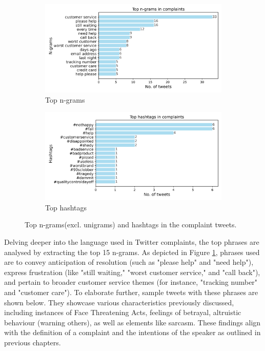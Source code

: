 \begin{figure}[htbp]
    \centering
    \captionsetup{font=small}
    \begin{subfigure}{0.49\textwidth}
        \centering
        \includegraphics[width=\linewidth]{figures/top_ngram_horiz_bar.png}
        \caption{Top n-grams}
        \label{fig: top_ngrams}
    \end{subfigure}
    \hfill
    \begin{subfigure}{0.49\textwidth}
        \centering
        \includegraphics[width=\linewidth]{figures/top_hash_horiz_bar.png}
        \caption{Top hashtags}
        \label{fig: top_hashtags}
    \end{subfigure}
    \caption{Top n-grams(excl. unigrams) and hashtags in the complaint tweets.}
    \label{fig: top_ngrams_hashtags}
\end{figure}

Delving deeper into the language used in Twitter complaints, the top phrases are analysed by extracting the top 15 n-grams. As depicted in Figure \ref{fig: top_ngrams}, phrases used are to convey anticipation of resolution (such as "please help" and "need help"), express frustration (like "still waiting," "worst customer service," and "call back"), and pertain to broader customer service themes (for instance, "tracking number" and "customer care"). To elaborate further, sample tweets with these phrases are shown below. They showcase various characteristics previously discussed, including instances of Face Threatening Acts, feelings of betrayal, altruistic behaviour (warning others), as well as elements like sarcasm. These findings align with the definition of a complaint and the intentions of the speaker as outlined in previous chapters.\\

